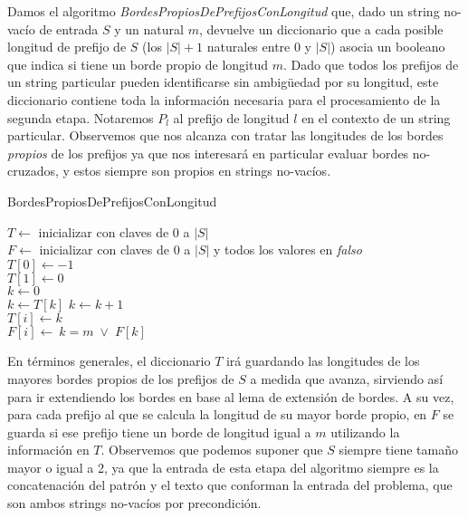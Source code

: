 Damos el algoritmo \textit{BordesPropiosDePrefijosConLongitud} que, dado un string no-vacío de entrada $S$ y un natural $m$, devuelve un diccionario que a cada posible longitud de prefijo de $S$ (los $|S|+1$ naturales entre 0 y $|S|$) asocia un booleano que indica si tiene un borde propio de longitud $m$. Dado que todos los prefijos de un string particular pueden identificarse sin ambigüedad por su longitud, este diccionario contiene toda la información necesaria para el procesamiento de la segunda etapa. Notaremos $P_l$ al prefijo de longitud $l$ en el contexto de un string particular. Observemos que nos alcanza con tratar las longitudes de los bordes \textit{propios} de los prefijos ya que nos interesará en particular evaluar bordes no-cruzados, y estos siempre son propios en strings no-vacíos.

\bigskip

\begin{algorithm}[H]
	\caption{BordesPropiosDePrefijosConLongitud}

	$T \gets$ inicializar con claves de 0 a $|S|$ \\
	$F \gets$ inicializar con claves de 0 a $|S|$ y todos los valores en \textit{falso} \\
	$T [0] \gets -1$ \\
	$T [1] \gets 0$ \\
	$k \gets 0$ \\
	
     {
	 {
		$k \gets T[k]$
    	}
	$k \gets k+1$ \\
	$T[i] \gets k$ \\
	$F[i] \gets \: k = m \; \vee \; F[k]$
}

\end{algorithm}

\bigskip

En términos generales, el diccionario $T$ irá guardando las longitudes de los mayores bordes propios de los prefijos de $S$ a medida que avanza, sirviendo así para ir extendiendo los bordes en base al lema de extensión de bordes. A su vez, para cada prefijo al que se calcula la longitud de su mayor borde propio, en $F$ se guarda si ese prefijo tiene un borde de longitud igual a $m$ utilizando la información en $T$. Observemos que podemos suponer que $S$ siempre tiene tamaño mayor o igual a 2, ya que la entrada de esta etapa del algoritmo siempre es la concatenación del patrón y el texto que conforman la entrada del problema, que son ambos strings no-vacíos por precondición. 

